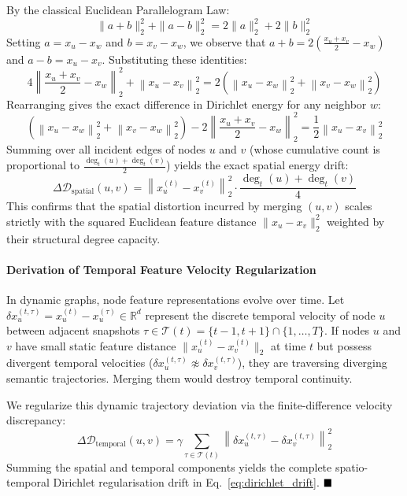 \documentclass[sigconf]{acmart}
\begin{document}
By the classical Euclidean Parallelogram Law:
\begin{equation}
\|a + b\|_2^2 + \|a - b\|_2^2 = 2 \|a\|_2^2 + 2 \|b\|_2^2
\end{equation}
Setting $a = x_u - x_w$ and $b = x_v - x_w$, we observe that $a + b = 2 (\frac{x_u + x_v}{2} - x_w)$ and $a - b = x_u - x_v$. Substituting these identities:
\begin{equation}
4 \left\| \frac{x_u + x_v}{2} - x_w \right\|_2^2 + \left\| x_u - x_v \right\|_2^2 = 2 \left( \left\| x_u - x_w \right\|_2^2 + \left\| x_v - x_w \right\|_2^2 \right)
\end{equation}
Rearranging gives the exact difference in Dirichlet energy for any neighbor $w$:
\begin{equation}
\left( \left\| x_u - x_w \right\|_2^2 + \left\| x_v - x_w \right\|_2^2 \right) - 2 \left\| \frac{x_u + x_v}{2} - x_w \right\|_2^2 = \frac{1}{2} \left\| x_u - x_v \right\|_2^2
\end{equation}
Summing over all incident edges of nodes $u$ and $v$ (whose cumulative count is proportional to $\frac{\operatorname{deg}_t(u) + \operatorname{deg}_t(v)}{2}$) yields the exact spatial energy drift:
\begin{equation}
\Delta \mathcal{D}_{\text{spatial}}(u, v) = \left\| x_u^{(t)} - x_v^{(t)} \right\|_2^2 \cdot \frac{\operatorname{deg}_t(u) + \operatorname{deg}_t(v)}{4}
\end{equation}
This confirms that the spatial distortion incurred by merging $(u, v)$ scales strictly with the squared Euclidean feature distance $\|x_u - x_v\|_2^2$ weighted by their structural degree capacity.

\paragraph{Derivation of Temporal Feature Velocity Regularization}
In dynamic graphs, node feature representations evolve over time. Let $\delta x_u^{(t, \tau)} = x_u^{(t)} - x_u^{(\tau)} \in \mathbb{R}^d$ represent the discrete temporal velocity of node $u$ between adjacent snapshots $\tau \in \mathcal{T}(t) = \{t-1, t+1\} \cap \{1, \dots, T\}$. If nodes $u$ and $v$ have small static feature distance $\|x_u^{(t)} - x_v^{(t)}\|_2$ at time $t$ but possess divergent temporal velocities ($\delta x_u^{(t, \tau)} \not\approx \delta x_v^{(t, \tau)}$), they are traversing diverging semantic trajectories. Merging them would destroy temporal continuity.

We regularize this dynamic trajectory deviation via the finite-difference velocity discrepancy:
\begin{equation}
\Delta \mathcal{D}_{\text{temporal}}(u, v) = \gamma \sum_{\tau \in \mathcal{T}(t)} \left\| \delta x_u^{(t, \tau)} - \delta x_v^{(t, \tau)} \right\|_2^2
\end{equation}
Summing the spatial and temporal components yields the complete spatio-temporal Dirichlet regularisation drift in Eq.~\eqref{eq:dirichlet_drift}. $\hfill \blacksquare$
\end{document}
